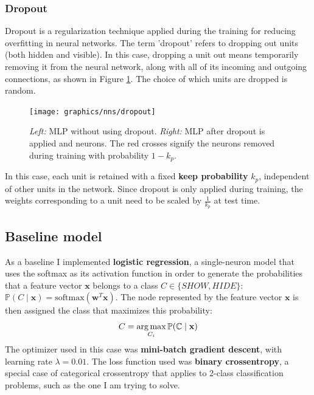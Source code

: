 	\subsubsection{Dropout} \label{Section: impl/ml/reg/dropout}
	Dropout\cite{dropout} is a regularization technique applied during the training for reducing overfitting in neural networks. The term 'dropout' refers to  dropping out units (both hidden and visible). In this case, dropping a unit out means temporarily removing it from the neural network, along with all of its incoming and outgoing connections, as shown in Figure \ref{Fig: impl/ml/dropout}. The choice of which units are dropped is random.
	\begin{figure}[H]
		\centering
		\texttt{[image: graphics/nns/dropout]}
		\caption{\textit{Left:} MLP without using dropout. \textit{Right:} MLP after dropout is applied and neurons. The red crosses signify the neurons removed during training with probability $1-k_p$.}
		\label{Fig: impl/ml/dropout}
	\end{figure}
	In this case, each unit is retained with a fixed \textbf{keep probability} $k_p$, independent of other units in the network. Since dropout is only applied during training, the weights corresponding to a unit need to be scaled by $\frac{1}{k_p}$ at test time.
	
	\subsection{Baseline model} \label{Section: impl/ml/baseline}
	As a baseline I implemented \textbf{logistic regression}, a single-neuron model that uses the softmax as its activation function in order to generate the probabilities that a feature vector $\mathbf{x}$ belongs to a class $C \in \{ SHOW, HIDE \}$: $\mathbb{P}(C\mid \mathbf{x}) = \text{softmax}(\mathbf{w}^T\mathbf{x})$. The node represented by the feature vector $\textbf{x}$ is then assigned the class that maximizes this probability:
	\begin{equation}
			C = \operatorname*{arg\,max}_{C_i} \mathbb{P(C\mid \mathbf{x})} 
	\end{equation} 
	The optimizer used in this case was \textbf{mini-batch gradient descent}, with learning rate $\lambda = 0.01$. The loss function used was \textbf{binary crossentropy}, a special case of categorical crossentropy that applies to 2-class classification problems, such as the one I am trying to solve. 
	

